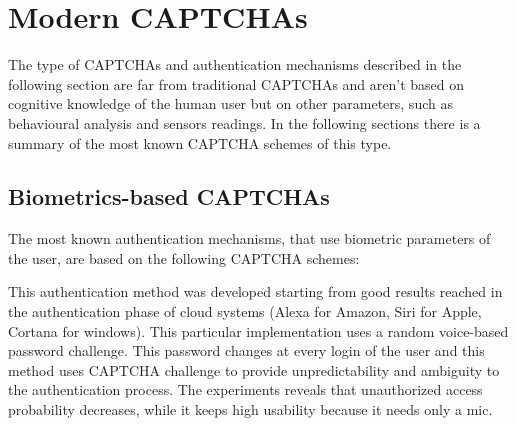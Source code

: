 \section{Modern CAPTCHAs}
The type of CAPTCHAs and authentication mechanisms described in the following section are far from traditional CAPTCHAs and aren't based on cognitive knowledge of the human user but on other parameters, such as behavioural analysis and sensors readings. In the following sections there is a summary of the most known CAPTCHA schemes of this type.

\subsection{Biometrics-based CAPTCHAs}
The most known authentication mechanisms, that use biometric parameters of the user, are based on the following CAPTCHA schemes:
\begin{itemize}
{This authentication method was developed starting from good results reached in the authentication phase of cloud systems (Alexa for Amazon, Siri for Apple, Cortana for windows)\cite{voice_CAPTCHA}. This particular implementation uses a random voice-based password challenge. This password changes at every login of the user and this method uses CAPTCHA challenge to provide unpredictability and ambiguity to the authentication process. The experiments reveals that unauthorized access probability decreases, while it keeps high usability because it needs
only a mic.}
\end{itemize}

